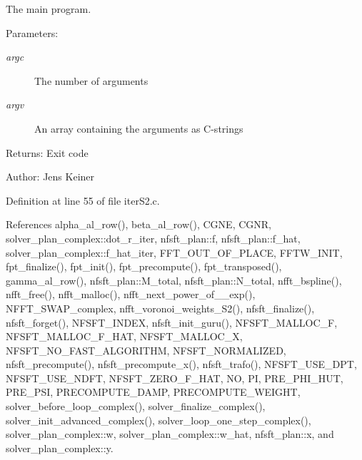 The main program. 

\begin{Desc}
\item[Parameters:]
\begin{description}
\item[{\em argc}]The number of arguments \item[{\em argv}]An array containing the arguments as C-strings\end{description}
\end{Desc}
\begin{Desc}
\item[Returns:]Exit code\end{Desc}
\begin{Desc}
\item[Author:]Jens Keiner \end{Desc}


Definition at line 55 of file iterS2.c.

References alpha\_\-al\_\-row(), beta\_\-al\_\-row(), CGNE, CGNR, solver\_\-plan\_\-complex::dot\_\-r\_\-iter, nfsft\_\-plan::f, nfsft\_\-plan::f\_\-hat, solver\_\-plan\_\-complex::f\_\-hat\_\-iter, FFT\_\-OUT\_\-OF\_\-PLACE, FFTW\_\-INIT, fpt\_\-finalize(), fpt\_\-init(), fpt\_\-precompute(), fpt\_\-transposed(), gamma\_\-al\_\-row(), nfsft\_\-plan::M\_\-total, nfsft\_\-plan::N\_\-total, nfft\_\-bspline(), nfft\_\-free(), nfft\_\-malloc(), nfft\_\-next\_\-power\_\-of\_\_\-exp(), NFFT\_\-SWAP\_\-complex, nfft\_\-voronoi\_\-weights\_\-S2(), nfsft\_\-finalize(), nfsft\_\-forget(), NFSFT\_\-INDEX, nfsft\_\-init\_\-guru(), NFSFT\_\-MALLOC\_\-F, NFSFT\_\-MALLOC\_\-F\_\-HAT, NFSFT\_\-MALLOC\_\-X, NFSFT\_\-NO\_\-FAST\_\-ALGORITHM, NFSFT\_\-NORMALIZED, nfsft\_\-precompute(), nfsft\_\-precompute\_\-x(), nfsft\_\-trafo(), NFSFT\_\-USE\_\-DPT, NFSFT\_\-USE\_\-NDFT, NFSFT\_\-ZERO\_\-F\_\-HAT, NO, PI, PRE\_\-PHI\_\-HUT, PRE\_\-PSI, PRECOMPUTE\_\-DAMP, PRECOMPUTE\_\-WEIGHT, solver\_\-before\_\-loop\_\-complex(), solver\_\-finalize\_\-complex(), solver\_\-init\_\-advanced\_\-complex(), solver\_\-loop\_\-one\_\-step\_\-complex(), solver\_\-plan\_\-complex::w, solver\_\-plan\_\-complex::w\_\-hat, nfsft\_\-plan::x, and solver\_\-plan\_\-complex::y.